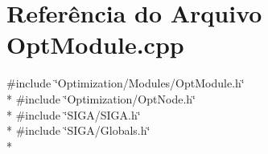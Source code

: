 \section{Referência do Arquivo Opt\+Module.\+cpp}
\label{_opt_module_8cpp}
{\ttfamily \#include \char`\"{}Optimization/\+Modules/\+Opt\+Module.\+h\char`\"{}}\\*
{\ttfamily \#include \char`\"{}Optimization/\+Opt\+Node.\+h\char`\"{}}\\*
{\ttfamily \#include \char`\"{}S\+I\+G\+A/\+S\+I\+G\+A.\+h\char`\"{}}\\*
{\ttfamily \#include \char`\"{}S\+I\+G\+A/\+Globals.\+h\char`\"{}}\\*
